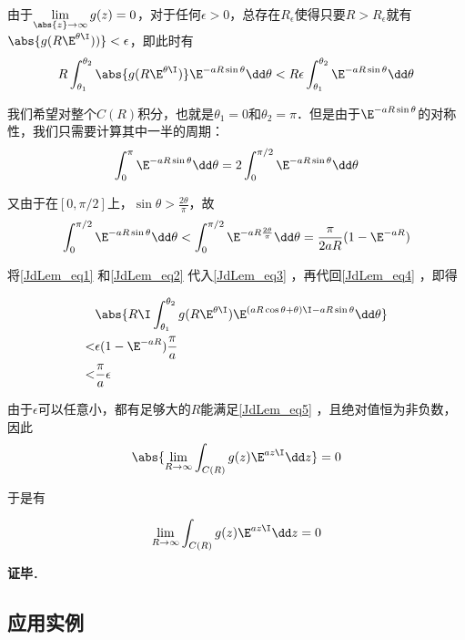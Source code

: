 由于$\lim\limits_{\abs{z}\to\infty}g(z)=0$，对于任何$\epsilon>0$，总存在$R_\epsilon$使得只要$R>R_\epsilon$就有$\abs{g(R\E^{\theta\I}))}<\epsilon$，即此时有
\begin{equation}\label{JdLem_eq3}
R\int_{\theta_1}^{\theta_2}\abs{g(R\E^{\theta\I})}\E^{-aR\sin\theta}\dd\theta  <  R\epsilon\int_{\theta_1}^{\theta_2}\E^{-aR\sin\theta}\dd\theta
\end{equation}

我们希望对整个$C(R)$积分，也就是$\theta_1=0$和$\theta_2=\pi$．但是由于$\E^{-aR\sin\theta}$的对称性，我们只需要计算其中一半的周期：
\begin{equation}\label{JdLem_eq1}
\int_{0}^{\pi}\E^{-aR\sin\theta}\dd\theta=2\int^{\pi/2}_{0}\E^{-aR\sin\theta}\dd\theta
\end{equation}

又由于在$[0, \pi/2]$上，$\sin\theta>\frac{2\theta}{\pi}$，故
\begin{equation}\label{JdLem_eq2}
\int^{\pi/2}_{0}\E^{-aR\sin\theta}\dd\theta<\int^{\pi/2}_{0}\E^{-aR\frac{2\theta}{\pi}}\dd\theta=\frac{\pi}{2aR}(1-\E^{-aR})
\end{equation}

将\autoref{JdLem_eq1} 和\autoref{JdLem_eq2} 代入\autoref{JdLem_eq3} ，再代回\autoref{JdLem_eq4} ，即得

\begin{equation}\label{JdLem_eq5}
\begin{aligned}
&\abs{R\I\int_{\theta_1}^{\theta_2}g(R\E^{\theta\I})\E^{(aR\cos\theta+\theta)\I-aR\sin\theta}\dd\theta}\\
<&\epsilon(1-\E^{-aR})\frac{\pi}{a}\\
<&\frac{\pi}{a}\epsilon
\end{aligned}
\end{equation}

由于$\epsilon$可以任意小，都有足够大的$R$能满足\autoref{JdLem_eq5} ，且绝对值恒为非负数，因此
\begin{equation}
\abs{\lim\limits_{R\to \infty}\int_{C(R)}g(z)\E^{az\I}\dd z}=0
\end{equation}

于是有

\begin{equation}
\lim\limits_{R\to \infty}\int_{C(R)}g(z)\E^{az\I}\dd z=0
\end{equation}


\textbf{证毕}．


\subsection{应用实例}


